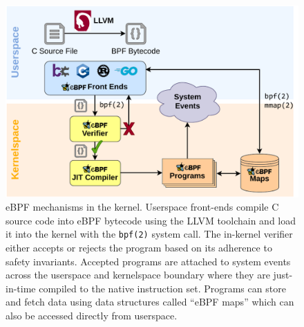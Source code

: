 \begin{figure}[htpb]
  \centering
  \includegraphics[width=0.8\linewidth]{figs/ebpf.pdf}
  \caption{
    eBPF mechanisms in the kernel. Userspace front-ends compile C source code into eBPF bytecode using the LLVM toolchain and load it into the kernel with the \texttt{bpf(2)} system call. The in-kernel verifier either accepts or rejects the program based on its adherence to safety invariants. Accepted programs are attached to system events across the userspace and kernelspace boundary where they are just-in-time compiled to the native instruction set. Programs can store and fetch data using data structures called \enquote{eBPF maps} which can also be accessed directly from userspace.
  }%
  \label{fig:ebpf}
\end{figure}

